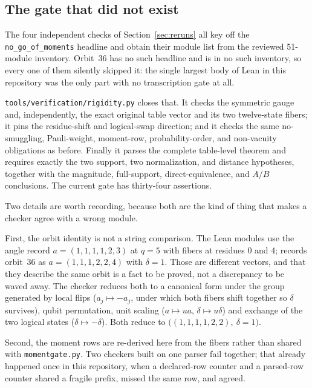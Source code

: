 \documentclass[11pt,a4paper]{article}
\newcommand{\lean}[1]{\texttt{#1}}
\theoremstyle{definition}
\begin{document}
\subsection{The gate that did not exist}

The four independent checks of Section~\ref{sec:reruns} all key off the
\lean{no\_go\_of\_moments} headline and obtain their module list from the
reviewed 51-module inventory. Orbit~36 has no such headline and is in no such
inventory, so every one of them silently skipped it: the single largest body of
Lean in this repository was the only part with no transcription gate at all.

\lean{tools/verification/rigidity.py} closes that. It checks the symmetric
gauge and, independently, the exact original table vector and its two twelve-state
fibers; it pins the residue-shift and logical-swap direction; and it checks the
same no-smuggling, Pauli-weight, moment-row, probability-order, and non-vacuity
obligations as before.  Finally it parses the complete table-level theorem and
requires exactly the two support, two normalization, and distance hypotheses,
together with the magnitude, full-support, direct-equivalence, and $A/B$
conclusions.  The current gate has thirty-four assertions.

Two details are worth recording, because both are the kind of thing that makes
a checker agree with a wrong module.

First, the orbit identity is not a string comparison. The Lean modules use the
angle record $a = (1,1,1,1,2,3)$ at $q = 5$ with fibers at residues $0$ and
$4$;  records orbit~36 as $a = (1,1,1,2,2,4)$ with
$\delta = 1$. Those are different vectors, and that they describe the same
orbit is a fact to be proved, not a discrepancy to be waved away. The checker
reduces both to a canonical form under the group generated by local flips
($a_j \mapsto -a_j$, under which both fibers shift together so $\delta$
survives), qubit permutation, unit scaling ($a \mapsto ua$, $\delta \mapsto
u\delta$) and exchange of the two logical states ($\delta \mapsto -\delta$).
Both reduce to $\bigl((1,1,1,1,2,2),\ \delta = 1\bigr)$.

Second, the moment rows are re-derived here from the fibers rather than shared
with \lean{momentgate.py}. Two checkers built on one parser fail together; that
already happened once in this repository, when a declared-row counter and a
parsed-row counter shared a fragile prefix, missed the same row, and agreed.
\end{document}
